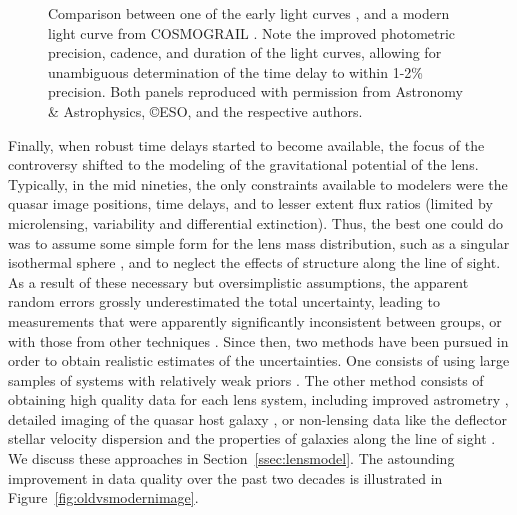 \begin{figure}
\begin{minipage}{0.48\linewidth}
\end{minipage}
\caption{Comparison between one of the early light curves \citep[left
panel, from][]{Van89}, and a modern light curve from COSMOGRAIL
\citep[right panel, from][]{Tew++13}. Note the improved photometric
precision, cadence, and duration of the light curves, allowing for
unambiguous determination of the time delay to within 1-2\% precision.
Both panels reproduced with permission from Astronomy \& Astrophysics,
\copyright ESO, and the respective authors.}
\label{fig:oldvsmoderndt}
\end{figure}

Finally, when robust time delays started to become available, the
focus of the controversy shifted to the modeling of the gravitational
potential of the lens. Typically, in the mid nineties, the only
constraints available to modelers were the quasar image positions,
time delays, and to lesser extent flux ratios (limited by
microlensing, variability and differential extinction). Thus, the best
one could do was to assume some simple form for the lens mass
distribution, such as a singular isothermal sphere \citep{K+F99},
and to neglect the
effects of structure along the line of sight. As a result of these necessary
but oversimplistic assumptions, the apparent random errors grossly underestimated
the total uncertainty, leading to measurements that were apparently
significantly inconsistent
between groups, or with those from other techniques
\citep{K+S04}. Since then, two methods have been pursued in order to
obtain realistic estimates of the uncertainties. One consists of using
large samples of systems with relatively weak priors
\citep{Ogu07b}. The other method consists of obtaining high quality data for
each lens system, including improved astrometry \citep{Cou++97}, detailed imaging of
the quasar host galaxy
\citep{Keeton:2000p241,KKM01,Koo++03,WBB04,Suy++06}, or non-lensing data like the deflector
stellar velocity dispersion \citep{T+K02b} and the properties of
galaxies along the line of sight \citep{K+Z04,Suy++10}. We discuss
these approaches in Section~\ref{ssec:lensmodel}. The astounding
improvement in data quality over the past two decades is illustrated
in Figure~\ref{fig:oldvsmodernimage}.

